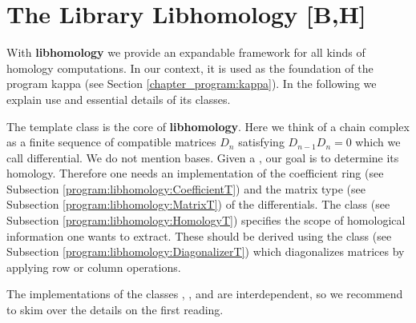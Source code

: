\section{The Library Libhomology [B,H]}
\label{program:libhomology}

With {\bf libhomology} we provide an expandable framework for all kinds of homology computations.
In our context, it is used as the foundation of the program kappa (see Section \ref{chapter_program:kappa}).
In the following we explain use and essential details of its classes.

The template class  is the core of {\bf libhomology}.
Here we think of a chain complex as a finite sequence of compatible matrices $D_n$ satisfying $D_{n-1} D_n = 0$ which we call differential.
We do not mention bases.
Given a , our goal is to determine its homology.
Therefore one needs an implementation of the coefficient ring  (see Subsection \ref{program:libhomology:CoefficientT}) and the matrix type  (see Subsection \ref{program:libhomology:MatrixT}) of the differentials.
The class  (see Subsection \ref{program:libhomology:HomologyT}) specifies the scope of homological information one wants to extract.
These should be derived using the class  (see Subsection \ref{program:libhomology:DiagonalizerT}) which diagonalizes matrices by applying row or column operations.

The implementations of the classes , ,  and  are interdependent,
so we recommend to skim over the details on the first reading.






